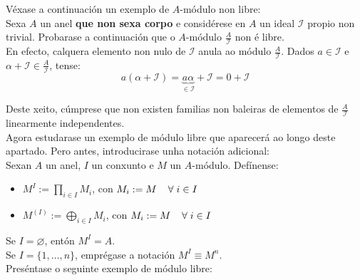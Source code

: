 \documentclass[twoside]{report}
\theoremstyle{mystyle}
\begin{document}
\noindent Véxase a continuación un exemplo de $A$-módulo non libre:\\

\noindent Sexa $A$ un anel \textbf{que non sexa corpo} e considérese en $A$ un ideal $\mathcal{I}$ propio non trivial. Probarase a continuación que o $A$-módulo $\displaystyle \frac{A}{\mathcal{I}}$ non é libre.\\

\noindent En efecto, calquera elemento non nulo de $\mathcal{I}$ anula ao módulo $\displaystyle \frac{A}{\mathcal{I}}$. Dados $a \in \mathcal{I}$ e $\alpha + \mathcal{I} \in \displaystyle \frac{A}{\mathcal{I}}$, tense:
$$a(\alpha + \mathcal{I}) = \underbrace{a\alpha}_{\in \mathcal{I}} + \mathcal{I} = 0 + \mathcal{I}$$

\noindent Deste xeito, cúmprese que non existen familias non baleiras de elementos de $\displaystyle \frac{A}{\mathcal{I}}$ linearmente independentes.\\

\noindent Agora estudarase un exemplo de módulo libre que aparecerá ao longo deste apartado. Pero antes, introducirase unha notación adicional:\\

\noindent Sexan $A$ un anel, $I$ un conxunto e $M$ un $A$-módulo. Defínense:\\
\begin{itemize}
    \item $M^{I} := \displaystyle \prod_{i \in I} M_{i}$, con $M_{i} := M \hspace{4mm} \forall \hspace{1mm} i \in I$
    \item $M^{(I)} := \displaystyle \bigoplus_{i \in I} M_{i}$, con $M_{i} := M \hspace{4mm} \forall \hspace{1mm} i \in I$
\end{itemize}

\noindent Se $I = \varnothing$, entón $M^{I} = A$.\\

\noindent Se $I = \{1, \ldots, n\}$, emprégase a notación $M^{I} \equiv M^{n}$.\\

\noindent Preséntase o seguinte exemplo de módulo libre:
\end{document}
